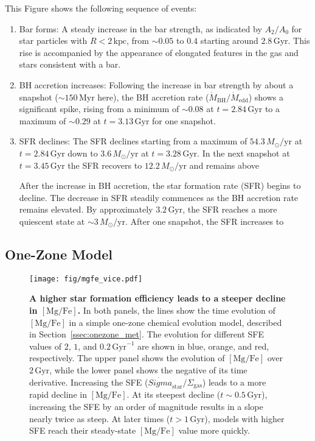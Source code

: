 \documentclass[twocolumn]{aastex631}
\newcommand{\Msun}{\ensuremath{M_{\odot}}}
\newcommand{\Gyr}{\ensuremath{\textrm{Gyr}}}
\newcommand{\Myr}{\ensuremath{\textrm{Myr}}}
\newcommand{\kpc}{\ensuremath{\textrm{kpc}}}
\newcommand{\MgFe}{\ensuremath{[\textrm{Mg}/\textrm{Fe}]}}
\newcommand{\Msunyr}{\ensuremath{\Msun/\textrm{yr}}}
\begin{document}
This Figure shows the following sequence of events:
\begin{enumerate}
    \item Bar forms: A steady increase in the bar strength, as indicated by $A_2/A_0$ for star particles with $R<2\,\kpc$, from $\sim0.05$ to $0.4$ starting around $2.8\,\textrm{Gyr}$. This rise is accompanied by the appearance of elongated features in the gas and stars consistent with a bar.
    \item BH accretion increases: Following the increase in bar strength by about a snapshot ($\sim150\,\Myr$ here), the BH accretion rate ($\dot{M}_{\textrm{BH}}/\dot{M}_{\textrm{edd}}$) shows a significant spike, rising from a minimum of $\sim0.08$ at $t=2.84\,\Gyr$ to a maximum of $\sim0.29$ at $t=3.13\,\Gyr$ for one snapshot.
    \item SFR declines: The SFR declines starting from a maximum of $54.3\,\Msunyr$ at $t=2.84\,\Gyr$ down to $3.6\,\Msunyr$ at $t=3.28\,\Gyr$. In the next snapshot at $t=3.45\,\Gyr$ the SFR recovers to $12.2\,\Msunyr$ and remains above 
    
    After the increase in BH accretion, the star formation rate (SFR) begins to decline. The decrease in SFR steadily commences as the BH accretion rate remains elevated. By approximately $3.2\,\textrm{Gyr}$, the SFR reaches a more quiescent state at $\sim3\,\Msunyr$. After one snapshot, the SFR increases to
\end{enumerate}

\subsection{One-Zone Model}\label{ssec:onezone}

\begin{figure}
  \centering
  \texttt{[image: fig/mgfe\_vice.pdf]}
  \caption{\textbf{A higher star formation efficiency leads to a steeper decline in \MgFe{}.} In both panels, the lines show the time evolution of \MgFe{} in a simple one-zone chemical evolution model, described in Section~\ref{ssec:onezone_met}. The evolution for different SFE values of $2$, $1$, and $0.2\,\textrm{Gyr}^{-1}$ are shown in blue, orange, and red, respectively.  The upper panel shows the evolution of \MgFe{} over $2\,\Gyr$, while the lower panel shows the negative of its time derivative. Increasing the SFE ($\dot{Sigma}_{\textrm{star}}/\Sigma_{\textrm{gas}}$) leads to a more rapid decline in \MgFe{}. At its steepest decline ($t\sim0.5\,\Gyr$), increasing the SFE by an order of magnitude results in a slope nearly twice as steep. At later times ($t > 1\,\Gyr$), models with higher SFE reach their steady-state \MgFe{} value more quickly.}
  \label{fig:vice}
\end{figure}
\end{document}
